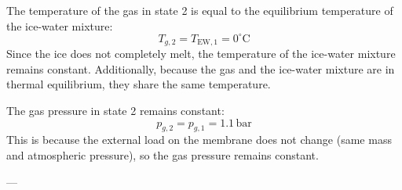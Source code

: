 The temperature of the gas in state 2 is equal to the equilibrium temperature of the ice-water mixture:  
\[
T_{g,2} = T_{\text{EW},1} = 0^\circ\text{C}
\]  
Since the ice does not completely melt, the temperature of the ice-water mixture remains constant. Additionally, because the gas and the ice-water mixture are in thermal equilibrium, they share the same temperature.  

The gas pressure in state 2 remains constant:  
\[
p_{g,2} = p_{g,1} = 1.1 \, \text{bar}
\]  
This is because the external load on the membrane does not change (same mass and atmospheric pressure), so the gas pressure remains constant.  

---